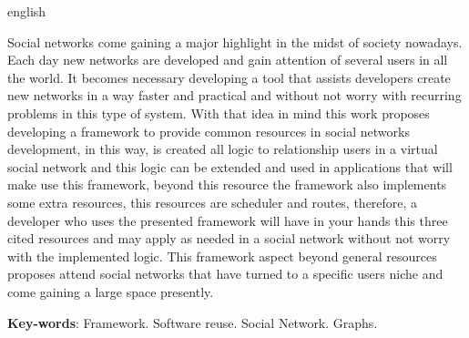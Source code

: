 \begin{resumo}[Abstract]
 \begin{otherlanguage*}{english}
   
   Social networks come gaining a major highlight in the midst of society nowadays. Each day new networks are developed and gain attention of several users in all the world. It becomes necessary developing a tool that assists developers create new networks in a way faster and practical and without not worry with recurring problems in this type of system. With that idea in mind this work proposes developing a framework to provide common resources in social networks development, in this way, is created all logic to relationship users in a virtual social network and this logic can be extended and used in applications that will make use this framework, beyond this resource the framework also implements some extra resources, this resources are scheduler and routes, therefore, a developer who uses the presented framework will have in your hands this three cited resources and may apply as needed in a social network without not worry with the implemented logic. This framework aspect beyond general resources proposes attend social networks that have turned to a specific users niche and come gaining a large space presently.

   \vspace{\onelineskip}
 
   \noindent 
   \textbf{Key-words}: Framework. Software reuse. Social Network. Graphs.
 \end{otherlanguage*}
\end{resumo}
